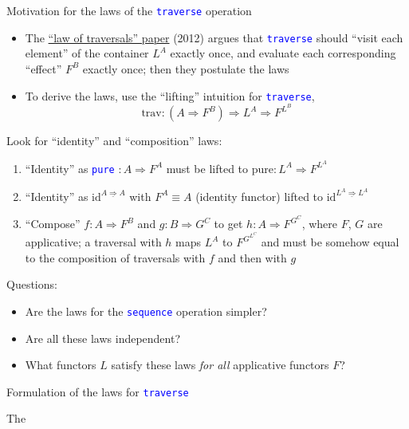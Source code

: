 \documentclass[english]{beamer}
\begin{document}
\begin{frame}{Motivation for the laws of the \texttt{\textcolor{blue}{\footnotesize{}traverse}}
operation }
\begin{itemize}
\item \vspace{-0.15cm}The \href{https://arxiv.org/pdf/1202.2919.pdf}{\textquotedblleft law of traversals\textquotedblright{} paper}
(2012) argues that \texttt{\textcolor{blue}{\footnotesize{}traverse}}
should ``visit each element'' of the container $L^{A}$ exactly
once, and evaluate each corresponding ``effect'' $F^{B}$ exactly
once; then they postulate the laws
\item To derive the laws, use the ``lifting'' intuition for \texttt{\textcolor{blue}{\footnotesize{}traverse}},{\footnotesize{}
\[
\text{trav}:(A\Rightarrow F^{B})\Rightarrow L^{A}\Rightarrow F^{L^{B}}
\]
}{\footnotesize \par}
\end{itemize}
{\footnotesize{}L}ook for ``identity'' and ``composition'' laws:
\begin{enumerate}
\item ``Identity'' as \texttt{\textcolor{blue}{\footnotesize{}pure}} $:A\Rightarrow F^{A}$
must be lifted to $\text{pure}:L^{A}\Rightarrow F^{L^{A}}$
\item ``Identity'' as $\text{id}^{\underline{A\Rightarrow A}}$ with $F^{A}\equiv A$
(identity functor) lifted to $\text{id}^{\underline{L^{A}\Rightarrow L^{A}}}$
\item ``Compose'' $f:A\Rightarrow F^{B}$ and $g:B\Rightarrow G^{C}$
to get $h:A\Rightarrow F^{G^{C}}$, where $F$, $G$ are applicative;
a traversal with $h$ maps $L^{A}$ to $F^{G^{L^{C}}}$ and must be
somehow equal to the composition of traversals with $f$ and then
with $g$
\end{enumerate}
Questions:
\begin{itemize}
\item Are the laws for the \texttt{\textcolor{blue}{\footnotesize{}sequence}}
operation simpler?
\item Are all these laws independent?
\item What functors $L$ satisfy these laws \emph{for all} applicative functors
$F$?
\end{itemize}
\end{frame}

\begin{frame}{Formulation of the laws for \texttt{\textcolor{blue}{\footnotesize{}traverse}} }

\vspace{-0.15cm}The 
\end{frame}
\end{document}
